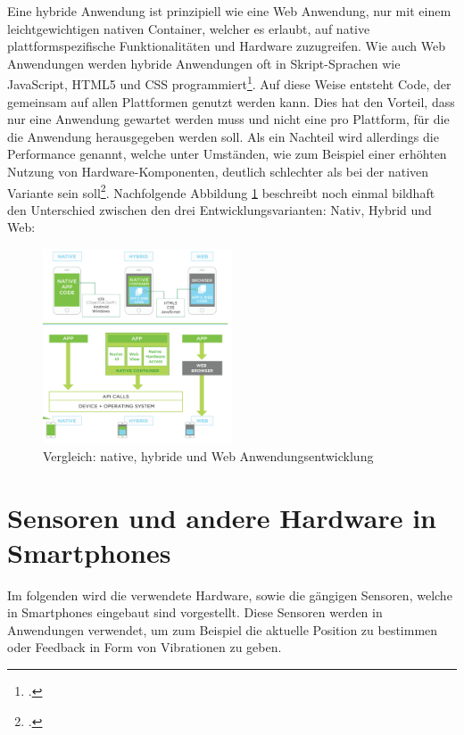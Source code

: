 Eine hybride Anwendung ist prinzipiell wie eine Web Anwendung, nur mit einem leichtgewichtigen nativen Container, welcher es erlaubt, auf native plattformspezifische Funktionalitäten und Hardware zuzugreifen. Wie auch Web Anwendungen werden hybride Anwendungen oft in Skript-Sprachen wie JavaScript, HTML5 und CSS programmiert\footcite{Varianten}. Auf diese Weise entsteht Code, der gemeinsam auf allen Plattformen genutzt werden kann. Dies hat den Vorteil, dass nur eine Anwendung gewartet werden muss und nicht eine pro Plattform, für die die Anwendung herausgegeben werden soll. Als ein Nachteil wird allerdings die Performance genannt, welche unter Umständen, wie zum Beispiel einer erhöhten Nutzung von Hardware-Komponenten, deutlich schlechter als bei der nativen Variante sein soll\footcite{Varianten}. Nachfolgende Abbildung  \ref{fig:VariantenAppEntwicklung} beschreibt noch einmal bildhaft den Unterschied zwischen den drei Entwicklungsvarianten: Nativ, Hybrid und Web: 
\clearpage

\begin{figure}[h]
	\centering
	\includegraphics[width=0.5\textwidth]{Bilder/Vergleich_Nativ_Hybrid.PNG}
	\caption{Vergleich: native, hybride und Web Anwendungsentwicklung}
	\label{fig:VariantenAppEntwicklung}
\end{figure}

\section{Sensoren und andere Hardware in Smartphones}

Im folgenden wird die verwendete Hardware, sowie die gängigen Sensoren, welche in Smartphones eingebaut sind vorgestellt. Diese Sensoren werden in Anwendungen verwendet, um zum Beispiel die aktuelle Position zu bestimmen oder Feedback in Form von Vibrationen zu geben. 

